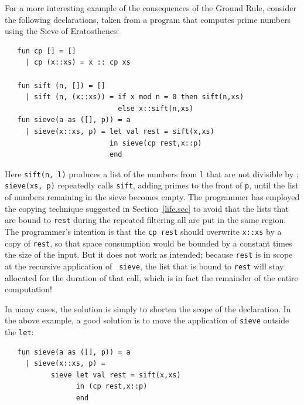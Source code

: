 \documentclass[12pt]{book}
\begin{document}
For a more interesting example of the consequences of the Ground Rule,
consider the following declarations, taken from a program that
computes prime numbers using the
%
Sieve of Eratosthenes:
\begin{verbatim}
   fun cp [] = []
     | cp (x::xs) = x :: cp xs 

   fun sift (n, []) = []
     | sift (n, (x::xs)) = if x mod n = 0 then sift(n,xs)
                           else x::sift(n,xs)
   fun sieve(a as ([], p)) = a
     | sieve(x::xs, p) = let val rest = sift(x,xs)
                         in sieve(cp rest,x::p)
                         end
\end{verbatim}
Here {\tt sift(n, l)} produces a list of the numbers from {\tt l} that
are not divisible by ; {\tt sieve(xs, p)} repeatedly calls
{\tt sift}, adding primes to the front of {\tt p}, until the list of
numbers remaining in the sieve becomes empty. The programmer has
employed the copying technique suggested in Section~\ref{life.sec} to
avoid that the lists that are bound to {\tt rest} during the repeated
filtering all are put in the same region. The programmer's intention
is that the {\tt cp rest} should overwrite {\tt x::xs} by a copy of
{\tt rest}, so that space consumption would be bounded by a constant
times the size of the input.  But it does not work as intended;
because {\tt rest} is in scope at the recursive application of {\tt
  sieve}, the list that is bound to {\tt rest} will stay allocated for
the duration of that call, which is in fact the remainder of the
entire computation!

In many cases, the solution is simply to shorten the scope of the
declaration.  In the above example, a good solution is to move the
application of {\tt sieve} outside the {\tt let}:
\begin{verbatim}
   fun sieve(a as ([], p)) = a
     | sieve(x::xs, p) = 
           sieve let val rest = sift(x,xs)
                 in (cp rest,x::p)
                 end
\end{verbatim}
\end{document}
